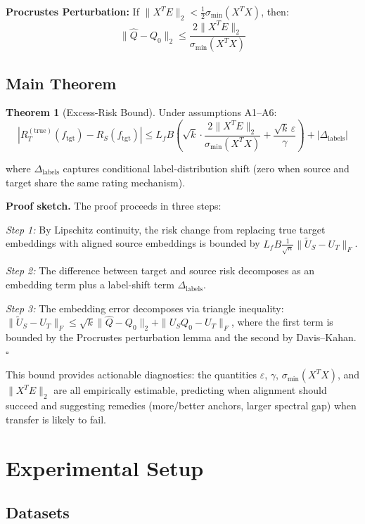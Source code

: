 \documentclass[conference]{IEEEtran}
\begin{document}
\textbf{Procrustes Perturbation:} If $\|X^T E\|_2 < \frac{1}{2}\sigma_{\min}(X^T X)$, then:
\begin{equation}
    \|\hat{Q} - Q_0\|_2 \leq \frac{2\|X^T E\|_2}{\sigma_{\min}(X^T X)}
\end{equation}

\subsection{Main Theorem}

\textbf{Theorem 1} (Excess-Risk Bound). Under assumptions A1--A6:
\begin{equation}
\left| R_T^{(\text{true})}(f_{\text{tgt}}) - R_S(f_{\text{tgt}}) \right| \leq L_f B \left( \sqrt{k} \cdot \frac{2\|X^T E\|_2}{\sigma_{\min}(X^T X)} + \frac{\sqrt{k}\,\varepsilon}{\gamma} \right) + |\Delta_{\text{labels}}|
\end{equation}

where $\Delta_{\text{labels}}$ captures conditional label-distribution shift (zero when source and target share the same rating mechanism).

\textbf{Proof sketch.} The proof proceeds in three steps:

\emph{Step 1:} By Lipschitz continuity, the risk change from replacing true target embeddings with aligned source embeddings is bounded by $L_f B \frac{1}{\sqrt{n}} \|\tilde{U}_S - U_T\|_F$.

\emph{Step 2:} The difference between target and source risk decomposes as an embedding term plus a label-shift term $\Delta_{\text{labels}}$.

\emph{Step 3:} The embedding error decomposes via triangle inequality:
$\|\tilde{U}_S - U_T\|_F \leq \sqrt{k}\|\hat{Q} - Q_0\|_2 + \|U_S Q_0 - U_T\|_F$,
where the first term is bounded by the Procrustes perturbation lemma and the second by Davis--Kahan. \hfill$\square$

This bound provides actionable diagnostics: the quantities $\varepsilon$, $\gamma$, $\sigma_{\min}(X^T X)$, and $\|X^T E\|_2$ are all empirically estimable, predicting when alignment should succeed and suggesting remedies (more/better anchors, larger spectral gap) when transfer is likely to fail.

\section{Experimental Setup}

\subsection{Datasets}
\end{document}
